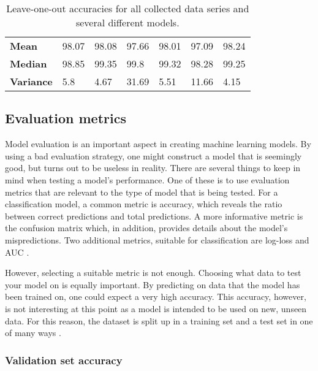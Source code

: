 \begin{table}
\begin{center}
\begin{adjustbox}{totalheight=\baselineskip}
\begin{tabular}{|l|l|l|l|l|l|l|}
		\hline
		\textbf{Mean} & 98.07 & 98.08 & 97.66 & 98.01 & 97.09 & \cellcolor{green!20}98.24\\
		\textbf{Median} & 98.85 & 99.35 & \cellcolor{green!20}99.8 & 99.32 & 98.28 & 99.25\\
		\textbf{Variance} & 5.8 & 4.67 & 31.69 & 5.51 & 11.66 & \cellcolor{green!20}4.15\\
		\hline
		\end{tabular}
\end{adjustbox}
	\end{center}
	\label{tab:loo}
	\caption{Leave-one-out accuracies for all collected data series and several different models.}
\end{table}

\subsection{Evaluation metrics}
Model evaluation is an important aspect in creating machine learning models. By using a bad evaluation strategy, one might construct a model that is seemingly good, but turns out to be useless in reality. There are several things to keep in mind when testing a model's performance. One of these is to use evaluation metrics that are relevant to the type of model that is being tested. For a classification model, a common metric is accuracy, which reveals the ratio between correct predictions and total predictions. A more informative metric is the confusion matrix which, in addition, provides details about the model's mispredictions. Two additional metrics, suitable for classification are log-loss and AUC \citep{zheng_2015}. 

However, selecting a suitable metric is not enough. Choosing what data to test your model on is equally important. By predicting on data that the model has been trained on, one could expect a very high accuracy. This accuracy, however, is not interesting at this point as a model is intended to be used on new, unseen data. For this reason, the dataset is split up in a training set and a test set in one of many ways \citep{raschka}.


\subsubsection{Validation set accuracy}



